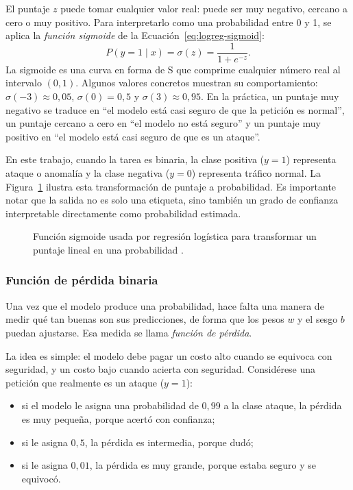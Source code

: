 \documentclass[12pt,oneside]{report}
\begin{document}
El puntaje $z$ puede tomar cualquier valor real: puede ser muy negativo,
cercano a cero o muy positivo. Para interpretarlo como una probabilidad
entre 0 y 1, se aplica la \textit{función sigmoide} de la Ecuación~\eqref{eq:logreg-sigmoid}:
\begin{equation}
\label{eq:logreg-sigmoid}
P(y=1\mid x)=\sigma(z)=\frac{1}{1+e^{-z}}.
\end{equation}
La sigmoide es una curva en forma de S que comprime cualquier número real
al intervalo $(0,1)$. Algunos valores concretos muestran su comportamiento:
$\sigma(-3)\approx 0{,}05$, $\sigma(0)=0{,}5$ y $\sigma(3)\approx 0{,}95$.
En la práctica, un puntaje muy negativo se traduce en ``el modelo está casi
seguro de que la petición es normal'', un puntaje cercano a cero en ``el modelo
no está seguro'' y un puntaje muy positivo en ``el modelo está casi seguro de
que es un ataque''.

En este trabajo, cuando la tarea es binaria, la clase positiva ($y=1$)
representa ataque o anomalía y la clase negativa ($y=0$) representa tráfico
normal. La Figura~\ref{fig:sigmoid} ilustra esta transformación de puntaje a
probabilidad. Es importante notar que la salida no es solo una etiqueta, sino
también un grado de confianza interpretable directamente como probabilidad
estimada.

\begin{figure}[H]
\centering
{}
\caption{Función sigmoide usada por regresión logística para transformar un
puntaje lineal en una probabilidad \cite{islr_logreg}.}
\label{fig:sigmoid}
\end{figure}

\subsubsection{Función de pérdida binaria}

Una vez que el modelo produce una probabilidad, hace falta una manera de
medir qué tan buenas son sus predicciones, de forma que los pesos $w$ y el
sesgo $b$ puedan ajustarse. Esa medida se llama \textit{función de pérdida}.

La idea es simple: el modelo debe pagar un costo alto cuando se
equivoca con seguridad, y un costo bajo cuando acierta con seguridad.
Considérese una petición que realmente es un ataque ($y=1$):
\begin{itemize}
  \item si el modelo le asigna una probabilidad de $0{,}99$ a la clase
        ataque, la pérdida es muy pequeña, porque acertó con confianza;
  \item si le asigna $0{,}5$, la pérdida es intermedia, porque dudó;
  \item si le asigna $0{,}01$, la pérdida es muy grande, porque estaba
        seguro y se equivocó.
\end{itemize}
\end{document}
